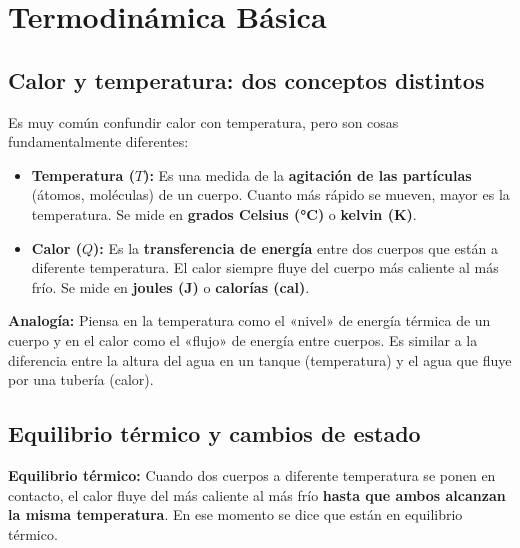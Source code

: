 \documentclass[12pt, letterpaper]{article}
\begin{document}
\newpage

\section{Termodinámica Básica}

\subsection{Calor y temperatura: dos conceptos distintos}

Es muy común confundir calor con temperatura, pero son cosas fundamentalmente diferentes:

\begin{cuadroteoria}
  \begin{itemize}[leftmargin=*]
    \item \textbf{Temperatura ($T$):} Es una medida de la \textbf{agitación de las partículas} (átomos, moléculas) de un cuerpo. Cuanto más rápido se mueven, mayor es la temperatura. Se mide en \textbf{grados Celsius (°C)} o \textbf{kelvin (K)}.

    \item \textbf{Calor ($Q$):} Es la \textbf{transferencia de energía} entre dos cuerpos que están a diferente temperatura. El calor siempre fluye del cuerpo más caliente al más frío. Se mide en \textbf{joules (J)} o \textbf{calorías (cal)}.
  \end{itemize}
\end{cuadroteoria}

\begin{cuadroadvertencia}
  \textbf{Analogía:} Piensa en la temperatura como el «nivel» de energía térmica de un cuerpo y en el calor como el «flujo» de energía entre cuerpos. Es similar a la diferencia entre la altura del agua en un tanque (temperatura) y el agua que fluye por una tubería (calor).
\end{cuadroadvertencia}

\subsection{Equilibrio térmico y cambios de estado}

\begin{cuadrosolucion}
  \textbf{Equilibrio térmico:} Cuando dos cuerpos a diferente temperatura se ponen en contacto, el calor fluye del más caliente al más frío \textbf{hasta que ambos alcanzan la misma temperatura}. En ese momento se dice que están en equilibrio térmico.
\end{cuadrosolucion}
\end{document}
